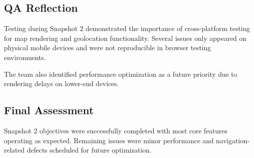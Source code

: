 \subsection{QA Reflection}

Testing during Snapshot 2 demonstrated the importance of cross-platform testing for map rendering and geolocation functionality. Several issues only appeared on physical mobile devices and were not reproducible in browser testing environments.

The team also identified performance optimization as a future priority due to rendering delays on lower-end devices.

\subsection{Final Assessment}

Snapshot 2 objectives were successfully completed with most core features operating as expected. Remaining issues were minor performance and navigation-related defects scheduled for future optimization.
